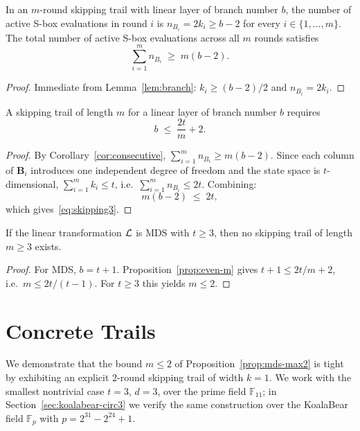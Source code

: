 \documentclass[11pt]{article}
\begin{document}
\begin{corollary}\label{cor:consecutive}
    In an $m$-round skipping trail with linear layer of branch number $b$,
    the number of active S-box evaluations in round $i$ is
    $n_{B_i} = 2k_i \geq b-2$ for every $i\in\{1,\ldots,m\}$.
    The total number of active S-box evaluations across all $m$ rounds satisfies
    \begin{equation}\label{eq:total-sbox}
        \sum_{i=1}^{m} n_{B_i} \;\geq\; m(b-2).
    \end{equation}
\end{corollary}
\begin{proof}
    Immediate from Lemma~\ref{lem:branch}: $k_i\geq(b-2)/2$ and $n_{B_i}=2k_i$.
\end{proof}

\begin{proposition}\label{prop:even-m}
    A skipping trail of length $m$ for a linear layer of branch number $b$ requires
    \begin{equation}\label{eq:skipping3}
        b \;\leq\; \frac{2t}{m} + 2.
    \end{equation}
\end{proposition}
\begin{proof}
    By Corollary~\ref{cor:consecutive}, $\sum_{i=1}^m n_{B_i}\geq m(b-2)$.
    Since each column of $\mathbf{B}_i$ introduces one independent degree of freedom
    and the state space is $t$-dimensional, $\sum_{i=1}^m k_i \leq t$, i.e.\
    $\sum_{i=1}^m n_{B_i} \leq 2t$.  Combining:
    \[
        m(b-2)\;\leq\;2t,
    \]
    which gives~\eqref{eq:skipping3}.
\end{proof}

\begin{proposition}\label{prop:mds-max2}
    If the linear transformation $\mathcal{L}$ is MDS with $t\geq 3$, then no skipping trail
    of length $m\geq 3$ exists.
\end{proposition}
\begin{proof}
    For MDS, $b=t+1$.  Proposition~\ref{prop:even-m} gives $t+1\leq 2t/m+2$,
    i.e.\ $m\leq 2t/(t-1)$.  For $t\geq 3$ this yields $m\leq 2$.
\end{proof}

\section{Concrete Trails}\label{sec:concrete}

We demonstrate that the bound $m\leq 2$ of Proposition~\ref{prop:mds-max2} is tight by
exhibiting an explicit 2-round skipping trail of width $k=1$.  We work with the smallest
nontrivial case $t=3$, $d=3$, over the prime field $\mathbb{F}_{11}$; in
Section~\ref{sec:koalabear-circ3} we verify the same construction over the KoalaBear
field $\mathbb{F}_p$ with $p=2^{31}-2^{24}+1$.
\end{document}
